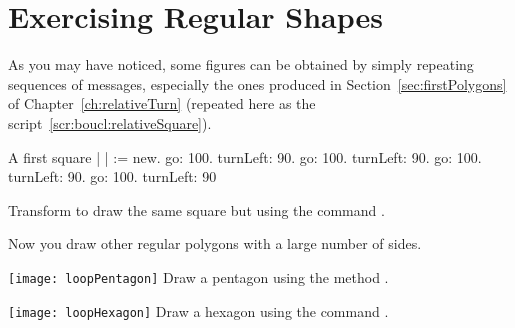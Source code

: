


\section{Exercising Regular Shapes}
As you may have noticed, some figures can be obtained by simply
repeating sequences of messages, especially the ones produced in
Section~\ref{sec:firstPolygons} of Chapter~\ref{ch:relativeTurn} (repeated here as the script~\ref{scr:boucl:relativeSquare}). 


\begin{scriptwithtitle}{A first square} \label{scr:boucl:relativeSquare}
| \caro |
\caro := \Turtle new.
\caro go: 100.
\caro turnLeft: 90.
\caro go: 100.
\caro turnLeft: 90.
\caro go: 100.
\caro turnLeft: 90.
\caro go: 100.
\caro turnLeft: 90
\end{scriptwithtitle}


\begin{exonofig}\label{exo:squareRepeat}
Transform   to
draw the same square but using the command \timesRepeat.
\end{exonofig}

Now you  draw other regular polygons with a large
number of sides.


\begin{exofigwithsize}{\texttt{[image: loopPentagon]}} \label{exo:pentagonRepeat}
Draw a pentagon using the method \timesRepeat.
\end{exofigwithsize}

\begin{exofigwithsize}{\texttt{[image: loopHexagon]}}\label{exo:hexagonRepeat}
Draw a hexagon using the command \timesRepeat.
\end{exofigwithsize}


